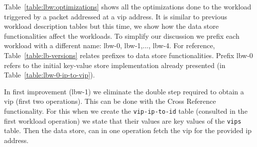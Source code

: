 \begin{figure}[ht]
\begin{floatrow}
\end{floatrow}
\end{figure}

Table~\ref{table:lbw:optimizations} shows all the optimizations done to the 
workload triggered by a packet addressed at a \gls{vip}
address.
It is similar to previous workload description tables but this time, we show how the data store functionalities affect the workloads. 
To simplify our discussion we prefix each workload with a different name: lbw-0, lbw-1,..., lbw-4. 
For reference, Table~\ref{table:lb-versions} relates prefixes to data store functionalities. 
Prefix lbw-0 refers to the initial key-value store implementation already presented (in Table~\ref{table:lbw-0-ip-to-vip}). 

In first improvement (lbw-1) we eliminate the double step required to obtain a \gls{vip} (first two operations). 
This can be done with the Cross Reference functionality. For this when we create  the \texttt{vip-ip-to-id} table (consulted in the first workload operation)  we state that their values are key values of the \texttt{vips} table. Then the data store, can  in one operation  fetch the \gls{vip} for the provided \gls{ip} address. 

